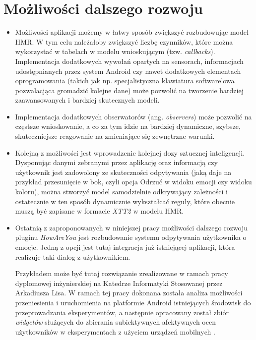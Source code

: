 
\section{Możliwości dalszego rozwoju}
\label{sec:mozwliwosciDalszegoRozwoju}


\begin{itemize}
	\item Możliwości aplikacji możemy w łatwy sposób zwiększyć rozbudowując model HMR. W tym celu należałoby zwiększyć liczbę czynników, które można wykorzystać w tabelach w modelu wnioskującym (tzw. \textit{callbacks}). Implementacja dodatkowych wywołań opartych na sensorach, informacjach udostępnianych przez system Android czy nawet dodatkowych elementach oprogramowania (takich jak np. specjalistyczna klawiatura software'owa pozwalacjąca gromadzić kolejne dane) może pozwolić na tworzenie bardziej zaawansowanych i bardziej skutecznych modeli.
	
	\item Implementacja dodatkowych obserwatorów (ang. \textit{observers}) może pozwolić na częstsze wnioskowanie, a co za tym idzie na bardziej dynamiczne, szybsze, skuteczniejsze reagowanie na zmieniające się zewnętrzne warunki.
	
	\item Kolejną z możliwości jest wprowadzenie kolejnej dozy sztucznej inteligencji. Dysponując danymi zebranymi przez aplikację oraz informacją czy użytkownik jest zadowolony ze skuteczności odpytywania (jaką daje na przykład przesunięcie w bok, czyli opcja Odrzuć w widoku emocji czy widoku koloru), można stworzyć model samodzielnie odkrywający zależności i ostatecznie w ten sposób dynamicznie wykształcać reguły, które obecnie muszą być zapisane w formacie \textit{XTT2} w modelu HMR.
	
 	\item Ostatnią z zaproponowanych w niniejszej pracy możliwości dalszego rozwoju pluginu \textit{HowAreYou} jest rozbudowanie systemu odpytywania użytkownika o emocje. Jedną z opcji jest tutaj integracja już istniejącej aplikacji, która realizuje taki dialog z użytkownikiem. 
 	
 	Przykładem może być tutaj rozwiązanie zrealizowane w ramach pracy dyplomowej inżynierskiej na Katedrze Informatyki Stosowanej przez Arkadiusza Lisa. W ramach tej pracy dokonana została analiza możliwości przeniesienia i uruchomienia na platformie Android istniejących środowisk do przeprowadzania eksperymentów, a następnie	opracowany został zbiór \textit{widgetów} służących do zbierania subiektywnych afektywnych ocen użytkowników w eksperymentach z użyciem urządzeń mobilnych \cite{ArkadiuszLis}.
 	

\end{itemize}
